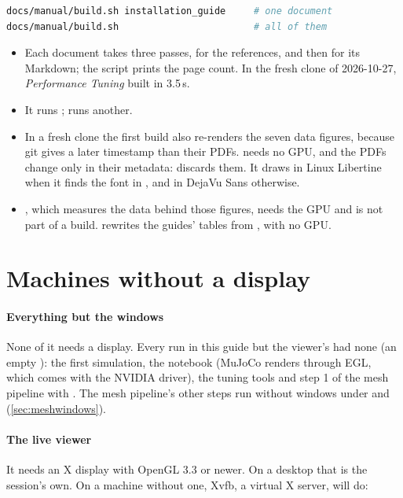 \begin{lstlisting}[language=bash]
docs/manual/build.sh installation_guide     # one document
docs/manual/build.sh                        # all of them
\end{lstlisting}

\begin{itemize}
\item Each document takes three  passes, for the references, and then  for its Markdown; the script prints the page count. In the fresh clone of 2026-10-27, \emph{Performance Tuning} built in 3.5\,s.
\item It runs ;  runs another.
\item In a fresh clone the first build also re-renders the seven data figures, because git gives  a later timestamp than their PDFs.  needs no GPU, and the PDFs change only in their metadata:  discards them. It draws in Linux Libertine when it finds the font in , and in DejaVu Sans otherwise.
\item {}, which measures the data behind those figures, needs the GPU and is not part of a build.  rewrites the guides' tables from , with no GPU.
\end{itemize}

\section{Machines without a display}\label{sec:headless}

\paragraph{Everything but the windows} None of it needs a display. Every run in this guide but the viewer's had none (an empty ): the first simulation, the notebook (MuJoCo renders through EGL, which comes with the NVIDIA driver), the tuning tools and step 1 of the mesh pipeline with . The mesh pipeline's other steps run without windows under  and  (\cref{sec:meshwindows}).

\paragraph{The live viewer} It needs an X display with OpenGL 3.3 or newer. On a desktop that is the session's own. On a machine without one, Xvfb, a virtual X server, will do:

